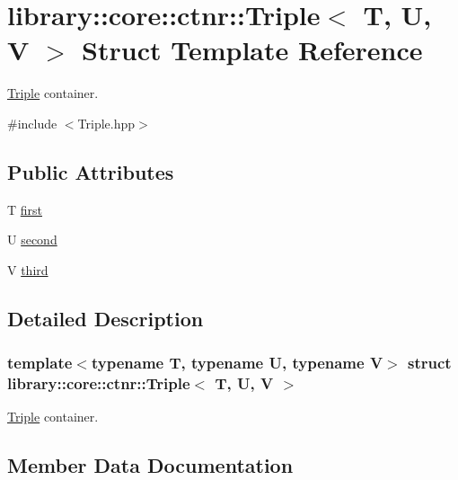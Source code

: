 \hypertarget{structlibrary_1_1core_1_1ctnr_1_1_triple}{}\section{library\+::core\+::ctnr\+::Triple$<$ T, U, V $>$ Struct Template Reference}
\label{structlibrary_1_1core_1_1ctnr_1_1_triple}


\mbox{\hyperlink{structlibrary_1_1core_1_1ctnr_1_1_triple}{Triple}} container.  




{\ttfamily \#include $<$Triple.\+hpp$>$}

\subsection*{Public Attributes}
\begin{DoxyCompactItemize}
\item 
T \mbox{\hyperlink{structlibrary_1_1core_1_1ctnr_1_1_triple_a620996265dbacc4b8961fcdd4694d1f4}{first}}
\item 
U \mbox{\hyperlink{structlibrary_1_1core_1_1ctnr_1_1_triple_a6727b9eb6453f0db0d0abfcd64dbc87e}{second}}
\item 
V \mbox{\hyperlink{structlibrary_1_1core_1_1ctnr_1_1_triple_a5fdac90c0f2e7a33f2fc5f3fc4dba8e2}{third}}
\end{DoxyCompactItemize}


\subsection{Detailed Description}
\subsubsection*{template$<$typename T, typename U, typename V$>$\newline
struct library\+::core\+::ctnr\+::\+Triple$<$ T, U, V $>$}

\mbox{\hyperlink{structlibrary_1_1core_1_1ctnr_1_1_triple}{Triple}} container. 

\subsection{Member Data Documentation}
\mbox{\label{structlibrary_1_1core_1_1ctnr_1_1_triple_a620996265dbacc4b8961fcdd4694d1f4}} 
